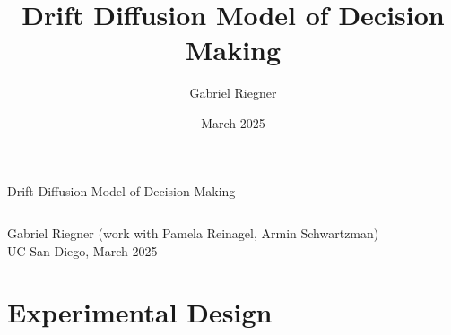 \documentclass[8pt]{beamer}
\title{Drift Diffusion Model of Decision Making}
\author[]{Gabriel Riegner}
\date{March 2025}
\begin{document}
\begin{frame}{Drift Diffusion Model of Decision Making}
\small
\begin{columns}
\tableofcontents[hideallsubsections]
\end{columns}
\vfill\centering
Gabriel Riegner (work with Pamela Reinagel, Armin Schwartzman)\\
UC San Diego, March 2025
\end{frame}

\section{Experimental Design}
\end{document}
